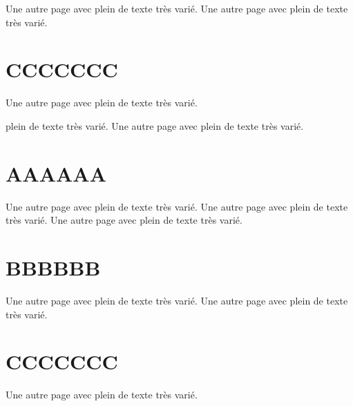 \documentclass[11pt]{template/thesul}
\begin{document}
        Une autre page avec plein de texte très varié.
        Une autre page avec plein de texte très varié.

    \section{CCCCCCC}

        Une autre page avec plein de texte très varié.


    plein de texte très varié.
    Une autre page avec plein de texte très varié.

    \section{AAAAAA}

        Une autre page avec plein de texte très varié.
        Une autre page avec plein de texte très varié.
        Une autre page avec plein de texte très varié.

    \section{BBBBBB}

        Une autre page avec plein de texte très varié.
        Une autre page avec plein de texte très varié.

    \section{CCCCCCC}

        Une autre page avec plein de texte très varié.






\printglossaries

\WriteThisInToc
\printindex
\end{document}
